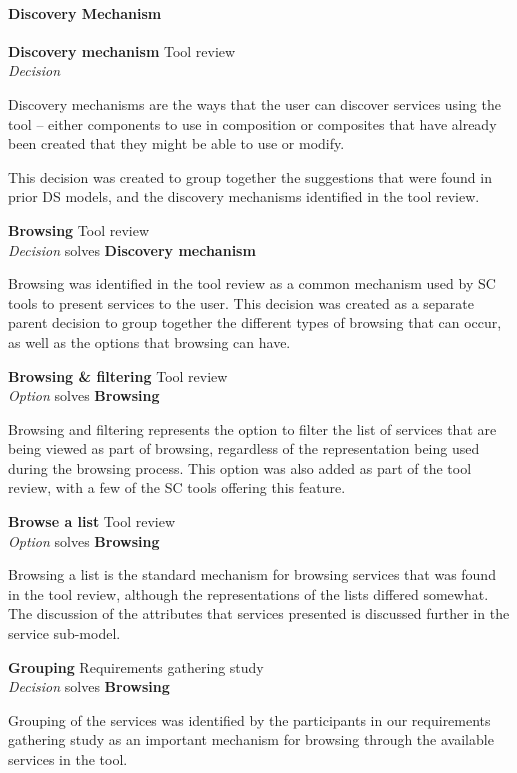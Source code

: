 \paragraph{Discovery Mechanism}

\textbf{Discovery mechanism} \hfill Tool review \\ \emph{Decision} \hfill 

Discovery mechanisms are the ways that the user can discover services using the tool -- either components to use in composition or composites that have already been created that they might be able to use or modify.

This decision was created to group together the suggestions that were found in prior DS models, and the discovery mechanisms identified in the tool review.

\textbf{Browsing} \hfill Tool review \\ \emph{Decision} \hfill solves \textbf{Discovery mechanism}

Browsing was identified in the tool review as a common mechanism used by SC tools to present services to the user. This decision was created as a separate parent decision to group together the different types of browsing that can occur, as well as the options that browsing can have.

\textbf{Browsing \& filtering} \hfill Tool review \\ \emph{Option} \hfill solves \textbf{Browsing}

Browsing and filtering represents the option to filter the list of services that are being viewed as part of browsing, regardless of the representation being used during the browsing process. This option was also added as part of the tool review, with a few of the SC tools offering this feature.

\textbf{Browse a list} \hfill Tool review \\ \emph{Option} \hfill solves \textbf{Browsing}

Browsing a list is the standard mechanism for browsing services that was found in the tool review, although the representations of the lists differed somewhat. The discussion of the attributes that services presented is discussed further in the service sub-model.

\textbf{Grouping} \hfill Requirements gathering study \\ \emph{Decision} \hfill solves \textbf{Browsing}

Grouping of the services was identified by the participants in our requirements gathering study as an important mechanism for browsing through the available services in the tool.

